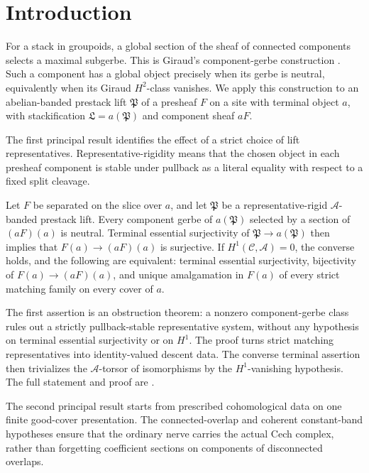 \section{Introduction}\label{sec:introduction}

For a stack in groupoids, a global section of the sheaf of connected
components selects a maximal subgerbe.  This is Giraud's component-gerbe
construction \cite[III, Prop.~2.1.5.3]{Giraud1971}.  Such a component has a
global object precisely when its gerbe is neutral, equivalently when its
Giraud \(H^2\)-class vanishes.  We apply this construction to an
abelian-banded prestack lift \(\mathfrak P\) of a presheaf \(F\) on a site
with terminal object \(a\), with stackification
\(\mathfrak L=a(\mathfrak P)\) and component sheaf \(aF\).

The first principal result identifies the effect of a strict choice of lift
representatives.  Representative-rigidity means that the chosen object in
each presheaf component is stable under pullback as a literal equality with
respect to a fixed split cleavage.

\begin{theoremA}
Let \(F\) be separated on the slice over \(a\), and let \(\mathfrak P\) be a
representative-rigid \(\mathscr A\)-banded prestack lift.  Every component
gerbe of \(a(\mathfrak P)\) selected by a section of \((aF)(a)\) is neutral.
Terminal essential surjectivity of \(\mathfrak P\to a(\mathfrak P)\) then
implies that \(F(a)\to(aF)(a)\) is surjective.  If
\(H^1(\mathcal C,\mathscr A)=0\), the converse holds, and the following are
equivalent: terminal essential surjectivity, bijectivity of
\(F(a)\to(aF)(a)\), and unique amalgamation in \(F(a)\) of every strict
matching family on every cover of \(a\).
\end{theoremA}

The first assertion is an obstruction theorem: a nonzero component-gerbe
class rules out a strictly pullback-stable representative system, without
any hypothesis on terminal essential surjectivity or on \(H^1\).  The proof
turns strict matching representatives into identity-valued descent data.
The converse terminal assertion then trivializes the \(\mathscr A\)-torsor
of isomorphisms by the \(H^1\)-vanishing hypothesis.  The full statement and
proof are .

The second principal result starts from prescribed cohomological data on one
finite good-cover presentation.  The connected-overlap and coherent
constant-band hypotheses ensure that the ordinary nerve carries the actual
Cech complex, rather than forgetting coefficient sections on components of
disconnected overlaps.

